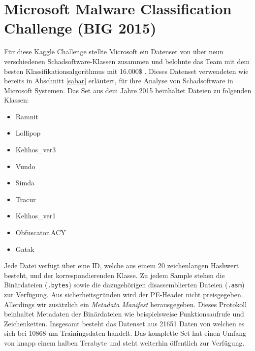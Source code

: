 \documentclass[
    12pt, %
    DIV10,
    ngerman, %
    a4paper, %
    oneside, %
    titlepage, %
    parskip=half, %
    headings=normal, %
    listof=totoc, %
    bibliography=totoc, %
    index=totoc, %
    captions=tableheading, %
    final %
]{scrreprt}
\begin{document}
\section{Microsoft Malware Classification Challenge (BIG 2015)}
Für diese Kaggle Challenge stellte Microsoft ein Datenset von über neun verschiedenen Schadsoftware-Klassen zusammen und belohnte das Team mit dem besten Klassifikationsalgorithmus mit 16.000\$ \parencite{Kaggle}. Dieses Datenset verwendeten wie bereits in Abschnitt \ref{sabar} erläutert, \textcite{Sabar2018} für ihre Analyse von Schadsoftware in Microsoft Systemen.
Das Set aus dem Jahre 2015 beinhaltet Dateien zu folgenden Klassen:
\begin{itemize}
\item Ramnit
\item Lollipop
\item Kelihos\_ver3
\item Vundo
\item Simda
\item Tracur
\item Kelihos\_ver1
\item Obfuscator.ACY
\item Gatak
\end{itemize}
Jede Datei verfügt über eine ID, welche aus einem 20 zeichenlangen Hashwert besteht, und der korrespondierenden Klasse. Zu jedem Sample stehen die Binärdateien (\texttt{.bytes}) sowie die dazugehörigen disassemblierten Dateien (\texttt{.asm}) zur Verfügung. Aus sicherheitsgründen wird der PE-Header nicht preisgegeben. Allerdings wir zusätzlich ein \emph{Metadata Manifest} herausgegeben. Dieses Protokoll beinhaltet Metadaten der Binärdateien wie beispielsweise Funktionsaufrufe und Zeichenketten.
Insgesamt besteht das Datenset aus 21651 Daten von welchen es sich bei 10868 um Trainingsdaten handelt. Das komplette Set hat einen Umfang von knapp einem halben Terabyte und steht weiterhin öffentlich zur Verfügung.
\end{document}
